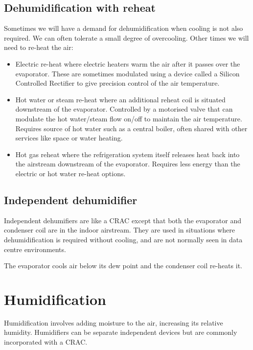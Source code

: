 \subsection{Dehumidification with reheat}
\label{sec:dehumidification-with-reheat}

Sometimes we will have a demand for dehumidification when cooling is not also required.
We can often tolerate a small degree of overcooling.
Other times we will need to re-heat the air:
\begin{itemize}
\item Electric re-heat where electric heaters warm the air after it passes over the evaporator.
  These are sometimes modulated using a device called a Silicon Controlled Rectifier to give precision control of the air temperature.
\item Hot water or steam re-heat where an additional reheat coil is situated downstream of the evaporator.
  Controlled by a motorised valve that can modulate the hot water/steam flow on/off to maintain the air temperature.
  Requires source of hot water such as a central boiler, often shared with other services like space or water heating. 
\item Hot gas reheat where the refrigeration system itself releases heat back into the airstream downstream of the evaporator.
  Requires less energy than the electric or hot water re-heat options.
\end{itemize}

\subsection{Independent dehumidifier}
\label{sec:independent-dehumidifier}

Independent dehumifiers are like a CRAC except that both the evaporator and condenser coil are in the indoor airstream.
They are used in situations where dehumidification is required without cooling, and are not normally seen in data centre environments. 

The evaporator cools air below its dew point and the condenser coil re-heats it. 

\section{Humidification}
\label{sec:humidification}

Humidification involves adding moisture to the air, increasing its relative humidity.
Humidifiers can be separate independent devices but are commonly incorporated with a CRAC.

